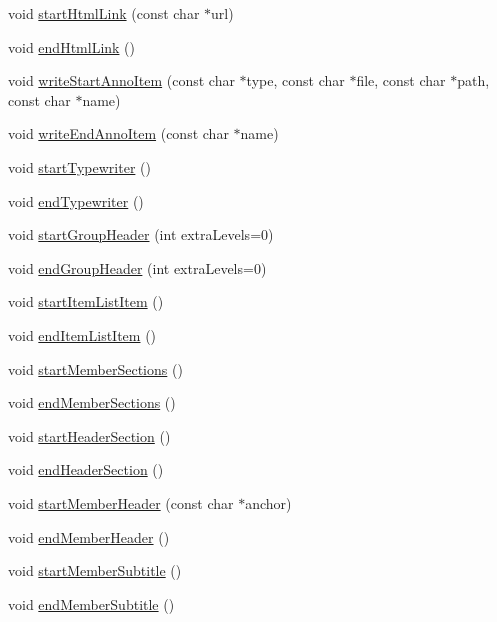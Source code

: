 \begin{DoxyCompactItemize}
void \hyperlink{class_output_list_acfe3869e533af42c1446e2fc91a37e5e}{start\+Html\+Link} (const char $\ast$url)
\item 
void \hyperlink{class_output_list_a14c59e71b1bb4cb6a6366a09ea62545f}{end\+Html\+Link} ()
\item 
void \hyperlink{class_output_list_ad50796b07d2302513be97de3491d7eea}{write\+Start\+Anno\+Item} (const char $\ast$type, const char $\ast$file, const char $\ast$path, const char $\ast$name)
\item 
void \hyperlink{class_output_list_a2059cf013631d0c66b4edb919c3b5acc}{write\+End\+Anno\+Item} (const char $\ast$name)
\item 
void \hyperlink{class_output_list_a848e77a8fd7af578497f7ee1ec163b98}{start\+Typewriter} ()
\item 
void \hyperlink{class_output_list_ad83302c45e73f387c9dc13789df012f7}{end\+Typewriter} ()
\item 
void \hyperlink{class_output_list_a08659f3995b246a54846fbcd5da928bd}{start\+Group\+Header} (int extra\+Levels=0)
\item 
void \hyperlink{class_output_list_aa655c0592e136ba962ac45bb69482638}{end\+Group\+Header} (int extra\+Levels=0)
\item 
void \hyperlink{class_output_list_a77e30e9a84b48907b886e8231dbbc20b}{start\+Item\+List\+Item} ()
\item 
void \hyperlink{class_output_list_a784d921c1961db570e1b12905fe97c05}{end\+Item\+List\+Item} ()
\item 
void \hyperlink{class_output_list_a6f8bf0192c18e0ea785c412b23f6fd3f}{start\+Member\+Sections} ()
\item 
void \hyperlink{class_output_list_aff8a0fa5afe518609c8e95ae05a57ee6}{end\+Member\+Sections} ()
\item 
void \hyperlink{class_output_list_a545dcbbbcdf8aac24e32df2abe0ea22d}{start\+Header\+Section} ()
\item 
void \hyperlink{class_output_list_a327fd876b42a81d55c668042dc3104d7}{end\+Header\+Section} ()
\item 
void \hyperlink{class_output_list_aaf2381e9d9a313b00e0737f040a1ea76}{start\+Member\+Header} (const char $\ast$anchor)
\item 
void \hyperlink{class_output_list_ad50904387e56ccb6532385bfe525e9a2}{end\+Member\+Header} ()
\item 
void \hyperlink{class_output_list_add8c37a5cb21fb366c941cea862b2285}{start\+Member\+Subtitle} ()
\item 
void \hyperlink{class_output_list_ad7bb1f47d3fe0d2bc473093e405f348e}{end\+Member\+Subtitle} ()

\end{DoxyCompactItemize}
